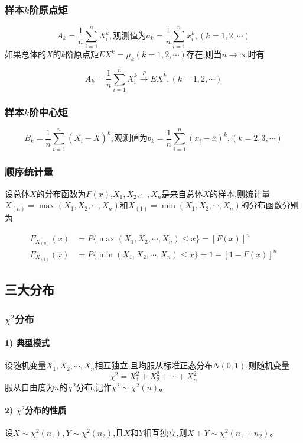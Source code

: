 \documentclass[UTF8]{ctexart}
\theoremstyle{remark}
\begin{document}
		\subsubsection{样本\(k\)阶原点矩}
		\[
		A_{k}=\frac{1}{n}\sum_{i = 1}^{n}X_{i}^{k},观测值为a_{k}=\frac{1}{n}\sum_{i = 1}^{n}x_{i}^{k},(k = 1,2,\cdots)
		\]
		如果总体的\(X\)的\(k\)阶原点矩\(EX^{k}=\mu_{k}(k = 1,2,\cdots)\)存在,则当\(n\to\infty\)时有

		\[
		A_{k}=\frac{1}{n}\sum_{i = 1}^{n}X_{i}^{k}\stackrel{P}{\longrightarrow}EX^{k},(k = 1,2,\cdots)
		\]
		
		\subsubsection{样本\(k\)阶中心矩}
		\[
		B_{k}=\frac{1}{n}\sum_{i = 1}^{n}(X_{i}-\overline{X})^{k},观测值为b_{k}=\frac{1}{n}\sum_{i = 1}^{n}(x_{i}-\overline{x})^{k},(k = 2,3,\cdots)
		\]
		
		\subsubsection{顺序统计量}
		设总体\(X\)的分布函数为\(F(x)\),\(X_1,X_2,\cdots,X_n\)是来自总体\(X\)的样本,则统计量\(X_{(n)}=\max(X_1,X_2,\cdots,X_n)\)和\(X_{(1)}=\min(X_1,X_2,\cdots,X_n)\)的分布函数分别为
		
		\begin{align*}
			F_{X_{(n)}}(x)&=P\{\max(X_1,X_2,\cdots,X_n)\leq x\}=[F(x)]^n\\
			F_{X_{(1)}}(x)&=P\{\min(X_1,X_2,\cdots,X_n)\leq x\}=1 - [1 - F(x)]^n
		\end{align*}
		
		\subsection{三大分布}
		\subsubsection{\(\chi^{2}\)分布}
		\paragraph{1) 典型模式}
		设随机变量\(X_1, X_2, \cdots, X_n\)相互独立,且均服从标准正态分布\(N(0,1)\),则随机变量
		\[
		\chi^{2}=X_1^{2}+X_2^{2}+\cdots + X_n^{2}
		\]
		服从自由度为\(n\)的\(\chi^{2}\)分布,记作\(\chi^{2}\sim\chi^{2}(n)\)。
		
		\paragraph{2) \(\chi^{2}\)分布的性质}
		设\(X\sim\chi^{2}(n_1), Y\sim\chi^{2}(n_2)\),且\(X\)和\(Y\)相互独立,则\(X + Y\sim\chi^{2}(n_1 + n_2)\)。
		
\end{document}
